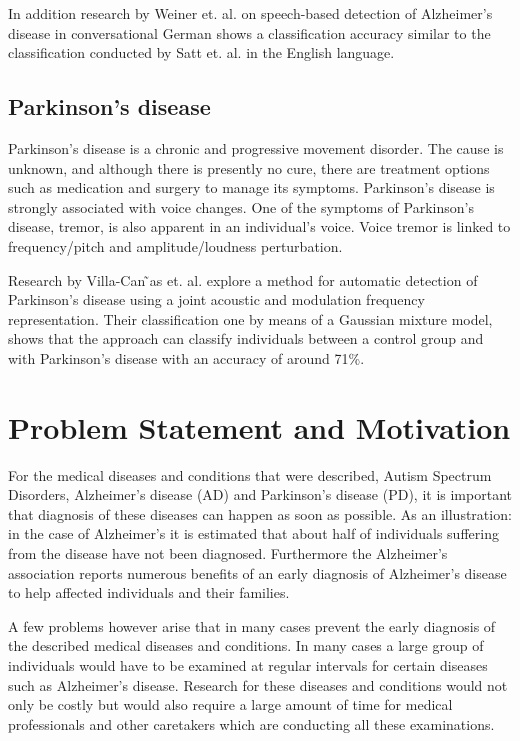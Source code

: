 \documentclass[conference]{IEEEtran}
\begin{document}
In addition research by Weiner et. al. on speech-based detection of Alzheimer’s disease in conversational German shows a classification accuracy similar to the classification conducted by Satt et. al. in the English language. \cite{c9} 

\subsection{Parkinson's disease}
Parkinson's disease is a chronic and progressive movement disorder. The cause is unknown, and although there is presently no cure, there are treatment options such as medication and surgery to manage its symptoms. \cite{c10} Parkinson’s disease is strongly associated with voice changes. One of the symptoms of Parkinson's disease, tremor, is also apparent in an individual's voice. Voice tremor is linked to frequency/pitch and amplitude/loudness perturbation. \cite{c11}

Research by Villa-Can ̃as et. al. explore a method for automatic detection of Parkinson’s disease using a joint acoustic and modulation frequency representation. Their classification one by means of a Gaussian mixture model, shows that the approach can classify individuals between a control group and with Parkinson's disease with an accuracy of around 71\%. \cite{c12}



\section{Problem Statement and Motivation}
For the medical diseases and conditions that were described, Autism Spectrum Disorders, Alzheimer’s disease (AD) and Parkinson’s disease (PD), it is important that diagnosis of these diseases can happen as soon as possible. As an illustration: in the case of Alzheimer’s it is estimated that about half of individuals suffering from the disease have not been diagnosed. \cite{c13} Furthermore the Alzheimer's association reports numerous benefits of an early diagnosis of Alzheimer's disease to help affected individuals and their families. \cite{c14}

A few problems however arise that in many cases prevent the early diagnosis of the described medical diseases and conditions. In many cases a large group of individuals would have to be examined at regular intervals for certain diseases such as Alzheimer's disease. Research for these diseases  and conditions would not only be costly but would also require a large amount of time for medical professionals and other caretakers which are conducting all these examinations.
\end{document}
